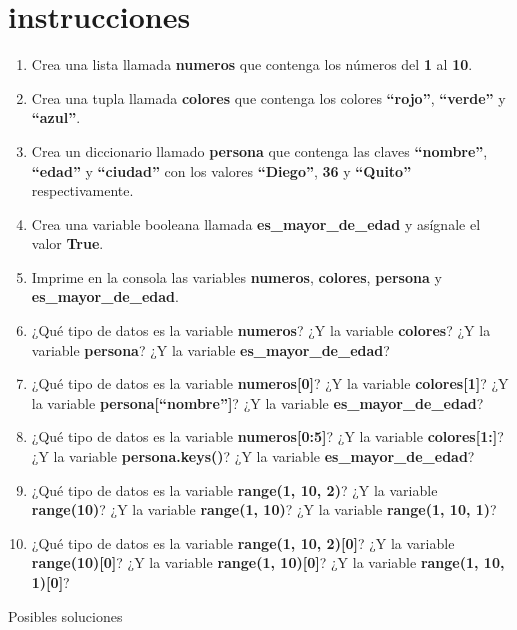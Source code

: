\documentclass[
  a4paper,
  DIV=11,
  numbers=noendperiod,
  onepage,
  openany]{scrreprt}
\begin{document}
\section{instrucciones}\label{instrucciones-2}

\begin{enumerate}
\def\labelenumi{\arabic{enumi}.}
\item
  Crea una lista llamada \textbf{numeros} que contenga los números del
  \textbf{1} al \textbf{10}.
\item
  Crea una tupla llamada \textbf{colores} que contenga los colores
  \textbf{``rojo''}, \textbf{``verde''} y \textbf{``azul''}.
\item
  Crea un diccionario llamado \textbf{persona} que contenga las claves
  \textbf{``nombre''}, \textbf{``edad''} y \textbf{``ciudad''} con los
  valores \textbf{``Diego''}, \textbf{36} y \textbf{``Quito''}
  respectivamente.
\item
  Crea una variable booleana llamada \textbf{es\_mayor\_de\_edad} y
  asígnale el valor \textbf{True}.
\item
  Imprime en la consola las variables \textbf{numeros},
  \textbf{colores}, \textbf{persona} y \textbf{es\_mayor\_de\_edad}.
\item
  ¿Qué tipo de datos es la variable \textbf{numeros}? ¿Y la variable
  \textbf{colores}? ¿Y la variable \textbf{persona}? ¿Y la variable
  \textbf{es\_mayor\_de\_edad}?
\item
  ¿Qué tipo de datos es la variable \textbf{numeros{[}0{]}}? ¿Y la
  variable \textbf{colores{[}1{]}}? ¿Y la variable
  \textbf{persona{[}``nombre''{]}}? ¿Y la variable
  \textbf{es\_mayor\_de\_edad}?
\item
  ¿Qué tipo de datos es la variable \textbf{numeros{[}0:5{]}}? ¿Y la
  variable \textbf{colores{[}1:{]}}? ¿Y la variable
  \textbf{persona.keys()}? ¿Y la variable \textbf{es\_mayor\_de\_edad}?
\item
  ¿Qué tipo de datos es la variable \textbf{range(1, 10, 2)}? ¿Y la
  variable \textbf{range(10)}? ¿Y la variable \textbf{range(1, 10)}? ¿Y
  la variable \textbf{range(1, 10, 1)}?
\item
  ¿Qué tipo de datos es la variable \textbf{range(1, 10, 2){[}0{]}}? ¿Y
  la variable \textbf{range(10){[}0{]}}? ¿Y la variable \textbf{range(1,
  10){[}0{]}}? ¿Y la variable \textbf{range(1, 10, 1){[}0{]}}?
\end{enumerate}

Posibles soluciones
\end{document}
